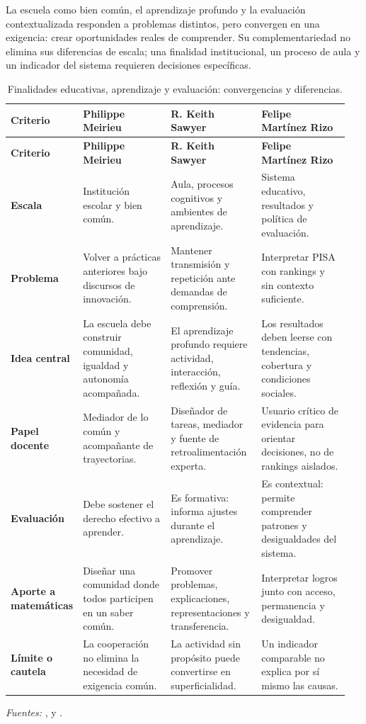 \documentclass[spanish,letterpaper,oneside]{article}
\begin{document}
La escuela como bien común, el aprendizaje profundo y la evaluación contextualizada responden a problemas distintos, pero convergen en una exigencia: crear oportunidades reales de comprender. Su complementariedad no elimina sus diferencias de escala; una finalidad institucional, un proceso de aula y un indicador del sistema requieren decisiones específicas.
\begingroup
\small
\singlespacing
\setlength{\tabcolsep}{3pt}
\renewcommand{\arraystretch}{1.2}
\begin{longtable}{@{}p{0.14\linewidth}p{0.27\linewidth}p{0.27\linewidth}p{0.27\linewidth}@{}}
\caption{Finalidades educativas, aprendizaje y evaluación: convergencias y diferencias.}\label{tab:comparativo-tres-lecturas}\\
\toprule
\textbf{Criterio} & \textbf{Philippe Meirieu} & \textbf{R. Keith Sawyer} & \textbf{Felipe Martínez Rizo} \\
\midrule
\endfirsthead
\toprule
\textbf{Criterio} & \textbf{Philippe Meirieu} & \textbf{R. Keith Sawyer} & \textbf{Felipe Martínez Rizo} \\
\midrule
\endhead
\textbf{Escala} & Institución escolar y bien común. & Aula, procesos cognitivos y ambientes de aprendizaje. & Sistema educativo, resultados y política de evaluación. \\
\textbf{Problema} & Volver a prácticas anteriores bajo discursos de innovación. & Mantener transmisión y repetición ante demandas de comprensión. & Interpretar PISA con rankings y sin contexto suficiente. \\
\textbf{Idea central} & La escuela debe construir comunidad, igualdad y autonomía acompañada. & El aprendizaje profundo requiere actividad, interacción, reflexión y guía. & Los resultados deben leerse con tendencias, cobertura y condiciones sociales. \\
\textbf{Papel docente} & Mediador de lo común y acompañante de trayectorias. & Diseñador de tareas, mediador y fuente de retroalimentación experta. & Usuario crítico de evidencia para orientar decisiones, no de rankings aislados. \\
\textbf{Evaluación} & Debe sostener el derecho efectivo a aprender. & Es formativa: informa ajustes durante el aprendizaje. & Es contextual: permite comprender patrones y desigualdades del sistema. \\
\textbf{Aporte a matemáticas} & Diseñar una comunidad donde todos participen en un saber común. & Promover problemas, explicaciones, representaciones y transferencia. & Interpretar logros junto con acceso, permanencia y desigualdad. \\
\textbf{Límite o cautela} & La cooperación no elimina la necesidad de exigencia común. & La actividad sin propósito puede convertirse en superficialidad. & Un indicador comparable no explica por sí mismo las causas. \\
\bottomrule
\end{longtable}
\endgroup
\noindent\textit{Fuentes:} \citet{meirieu2020escuela}, \citet{sawyer2008optimizing} y \citet{martinezRizo2026pisa}.
\end{document}
